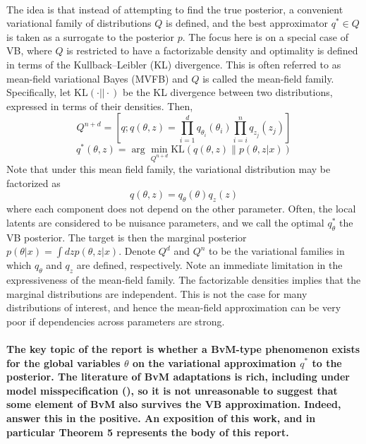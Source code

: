 \paragraph{} The idea is that instead of attempting to find the true posterior, a convenient variational family of distributions $Q$ is defined, and the best approximator $q^* \in Q$ is taken as a surrogate to the posterior $p$. The focus here is on a special case of VB, where $Q$ is restricted to have a factorizable density and optimality is defined in terms of the Kullback--Leibler (KL) divergence. This is often referred to as mean-field variational Bayes (MVFB) and $Q$ is called the mean-field family. Specifically, let $\text{KL}(\cdot || \cdot)$ be the KL divergence between two distributions, expressed in terms of their densities. Then,
\begin{equation}
Q^{n+d} = \left[ q; q(\theta, z) = \prod_{i=1}^d q_{\theta_i}(\theta_i) \prod_{i=i}^n q_{z_j}(z_j)  \right]
\end{equation}
\begin{equation}
\label{vbapprox}
q^*(\theta, z) = \arg \min_{Q^{n+d}} \text{KL}(q(\theta, z) \| p(\theta, z |x))
\end{equation}
Note that under this mean field family, the variational distribution may be factorized as
\begin{equation}
\label{fact}
q(\theta,z) = q_{\theta}(\theta)q_{z}(z)
\end{equation}
%
where each component does not depend on the other parameter. Often, the local latents are considered to be nuisance parameters, and we call the optimal $q^*_{\theta}$ the VB posterior. The target is then the marginal posterior $p(\theta|x) = \int dz p(\theta, z |x)$. Denote $Q^d$ and $Q^n$ to be the variational families in which $q_{\theta}$ and $q_z$ are defined, respectively. Note an immediate limitation in the expressiveness of the mean-field family. The factorizable densities implies that the marginal distributions are independent. This is not the case for many distributions of interest, and hence the mean-field approximation can be very poor if dependencies across parameters are strong. 

\paragraph{} \textbf{The key topic of the report is whether a BvM-type phenomenon exists for the global variables $\theta$ on the variational approximation $q^*$ to the posterior. The literature of BvM adaptations is rich, including under model misspecification (\cite{kleijn2012}), so it is not unreasonable to suggest that some element of BvM also survives the VB approximation. Indeed, \cite{Wang:2019:VBVM} answer this in the positive. An exposition of this work, and in particular Theorem 5 represents the body of this report.} 

